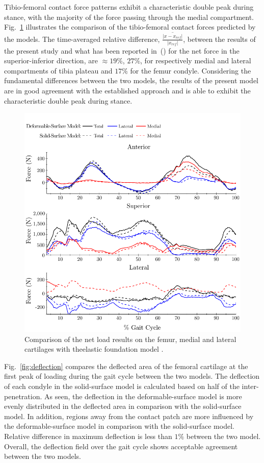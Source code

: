 Tibio-femoral contact force patterns exhibit a characteristic double peak during stance, with the majority of the force passing through the medial compartment. Fig.~\ref{fig:netLoad} illustrates the comparison of the tibio-femoral contact forces predicted by the models. The time-averaged relative difference, $\overline{\frac{|x-x_{ref}|}{|x_{ref}|}}$, between the results of the present study and what has been reported in~(\cite{Smith2016}) for the net force in the superior-inferior direction, are $\approx 19\%$, $27\%$, for respectively medial and lateral compartments of tibia plateau and $ 17\%$ for the femur condyle. Considering the fundamental differences between the two models, the results of the present model are in good agreement with the established approach \cite{Smith2016} and is able to exhibit the characteristic double peak during stance.
\begin{figure}
	\begin{center}
		\includegraphics[width=0.7\columnwidth]{images/AC/NetLoad.png}
		\caption{Comparison of the net load results on the femur, medial and lateral cartilages with theelastic foundation model \cite{Smith2016}.}\label{fig:netLoad}
	\end{center}
\end{figure}
Fig.~\ref{fig:deflection} compares the deflected area of the femoral cartilage at the first peak of loading during the gait cycle between the two models. The deflection of each condyle in the solid-surface model is calculated based on half of the inter-penetration. As seen, the deflection in the deformable-surface model is more evenly distributed in the deflected area in comparison with the solid-surface model. In addition, regions away from the contact patch are more influenced by the deformable-surface model in comparison with the solid-surface model. Relative difference in maximum deflection is less than $1\%$ between the two model. Overall, the deflection field over the gait cycle shows acceptable agreement between the two models.\\
